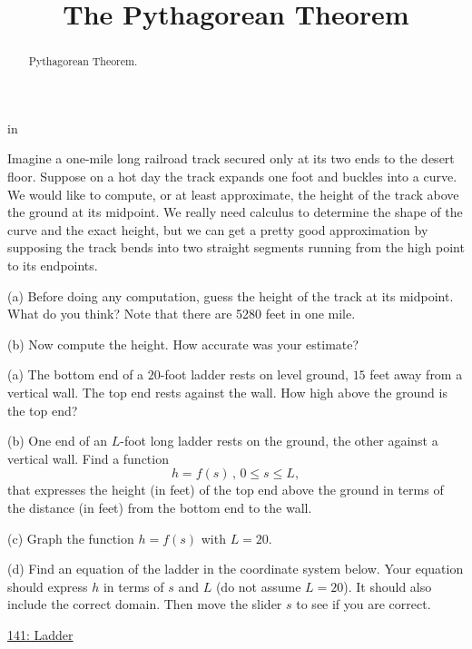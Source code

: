 \documentclass{ximera}
\title{The Pythagorean Theorem}
\newcommand{\pskip}{\vskip 0.1 in}
\begin{document}
\begin{abstract}
Pythagorean Theorem.
\end{abstract}
\maketitle


\pskip


\begin{question}  \label{Q324dfg45rhp}
Imagine a one-mile long railroad track secured only at its two ends to the desert floor. Suppose on a hot day the track expands one foot and buckles into a curve. We would like to compute, or at least approximate, the height of the track above the ground at its midpoint. We really need calculus to determine the shape of the curve and the exact height, but we can get a pretty good approximation by supposing the track bends into two straight segments running from the high point to its endpoints.


\begin{freeResponse}
(a) Before doing any computation, guess the height of the track at its midpoint. What do you think? Note that there are 5280 feet in one mile.
\end{freeResponse}

(b) Now compute the height. How accurate was your estimate?
\end{question}


\begin{question}  \label{Qdfdst4nb554334}
(a) The bottom end of a $20$-foot ladder rests on level ground, $15$ feet away from a vertical wall. The top end rests against the wall. How high above the ground is the top end?

(b) One end of an $L$-foot long ladder rests on the ground, the other against a vertical wall. Find a function 
\[
  h = f(s) \, , \, 0\leq s \leq L,
\]
that expresses the height (in feet) of the top end above the ground in terms of the distance (in feet) from the bottom end to the wall.

(c)  Graph the function $h = f(s)$ with $L=20$.

(d) Find an equation of the ladder in the coordinate system below. Your equation should express $h$ in terms of $s$ and $L$ (do not assume $L=20$). It should also include the correct domain. Then move the slider $s$ to see if you are correct.

\begin{exploration}

\begin{onlineOnly}
    \begin{center}
\end{center}
\end{onlineOnly}

\href{https://www.desmos.com/calculator/orpmncb1dx}{141: Ladder}

\end{exploration}
\end{question}
\end{document}
